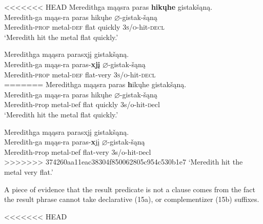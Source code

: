 \documentclass[output=paper]{LSP/langsci}
\begin{document}
\begin{exe}
\begin{exe}
\begin{exe}
\ex
\begin{xlist}

<<<<<<< HEAD
\ex \glll Meredithga mąąsra paras \textbf{hikųhe} gistakšąną. \\
 Meredith-ga mąąs-ra paras hikųhe {$\varnothing$}-gistak-šąną\\
Meredith-\textsc{prop} metal-\textsc{def} flat quickly \textsc{3s/o}-hit-\textsc{decl}\\ 
\glt `Meredith hit the metal flat quickly.'


\ex \glll Meredithga mąąsra parasxjį gistakšąną.\\
 Meredith-ga mąąs-ra paras-\textbf{xjį} {$\varnothing$}-gistak-šąną\\
Meredith-\textsc{prop} metal-\textsc{def} flat-very  \textsc{3s/o}-hit-\textsc{decl}\\
=======
\ex \glll Meredithga m\k{a}\k{a}sra paras {\textbf hik\k{u}he} gistak\v{s}\k{a}n\k{a}. \\
 Meredith-ga m\k{a}\k{a}s-ra paras hik\k{u}he $\varnothing$-gistak-\v{s}\k{a}n\k{a}\\
Meredith-{\textsc prop} metal-{\textsc def} flat quickly {\textsc 3s/o}-hit-{\textsc decl}\\ 
\glt `Meredith hit the metal flat quickly.'


\ex \glll Meredithga m\k{a}\k{a}sra parasxj\k{i} gistak\v{s}\k{a}n\k{a}.\\
 Meredith-ga m\k{a}\k{a}s-ra paras-{\textbf xj\k{i}} $\varnothing$-gistak-\v{s}\k{a}n\k{a}\\
Meredith-{\textsc prop} metal-{\textsc def} flat-very  {\textsc 3s/o}-hit-{\textsc decl}\\
>>>>>>> 374260aa11eac38304f850062805c954c530b1e7
\glt `Meredith hit the metal very flat.'

\end{xlist}
\end{exe}

A piece of evidence that the result predicate is not a clause comes from the fact the result phrase cannot take declarative (15a), or complementizer (15b) suffixes.

\begin{exe}
\ex
\begin{xlist}

<<<<<<< HEAD


\end{xlist}
\end{exe}
\end{exe}
\end{exe}
\end{document}

